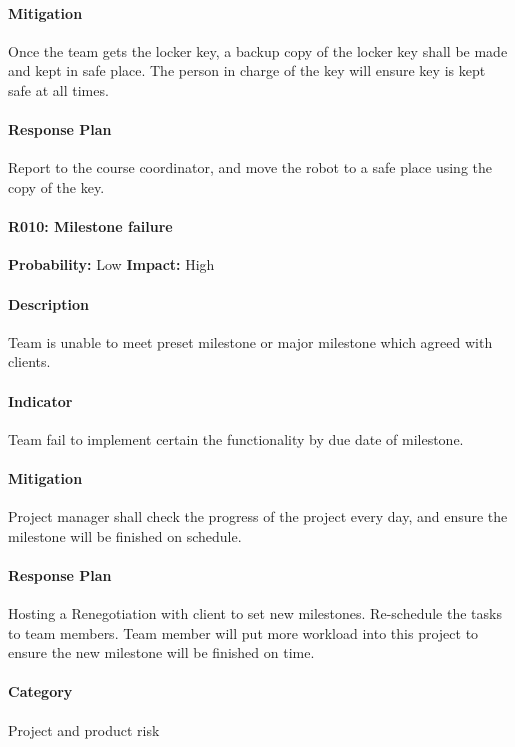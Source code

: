 \documentclass[11pt, a4paper]{report}
\begin{document}
	\paragraph{Mitigation}Once the team gets the locker key, a backup copy of the locker key shall be made and kept in safe place. The person in charge of the key will ensure key is kept safe at all times.
	\paragraph{Response Plan}Report to the course coordinator, and move the robot to a safe place using the copy of the key.\\
	\paragraph{R010: Milestone failure} \hspace{1cm} \textbf{Probability: }Low\hspace{1cm}   \textbf{Impact: }High
	\paragraph{Description}Team is unable to meet preset milestone or major milestone which agreed with clients.
	\paragraph{Indicator}Team fail to implement certain the functionality by due date of milestone. 
	\paragraph{Mitigation}Project manager shall check the progress of the project every day, and ensure the milestone will be finished on schedule. 
	\paragraph{Response Plan}Hosting a Renegotiation with client to set new milestones. Re-schedule the tasks to team members. Team member will put more workload into this project to ensure the new milestone will be finished on time.\\
	\paragraph{Category} Project and product risk

\end{document}
